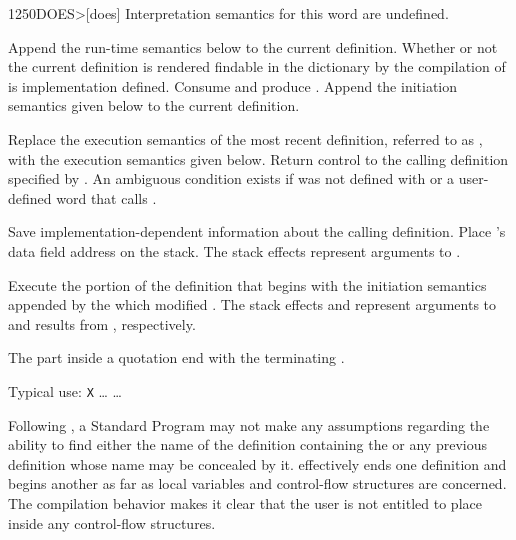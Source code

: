 \enlargethispage{10ex}
\begin{worddef}[DOES]{1250}{DOES>}[does]
\interpret
	Interpretation semantics for this word are undefined.

\compile

	Append the run-time semantics below to the current definition.
	Whether or not the current definition is rendered findable in
	the dictionary by the compilation of  is
	implementation defined. Consume  and
	produce . Append the initiation semantics
	given below to the current definition.

\runtime
	\stack{}{}

	Replace the execution semantics of the most recent definition,
	referred to as , with the  execution
	semantics given below. Return control to the calling definition
	specified by . An ambiguous condition exists
	if  was not defined with  or a
	user-defined word that calls .

\init

	Save implementation-dependent information 
	about the calling definition. Place 's data field
	address on the stack. The stack effects  represent
	arguments to .

\execute[name]

	Execute the portion of the definition that begins with the
	initiation semantics appended by the  which modified
	. The stack effects  and 
	represent arguments to and results from ,
	respectively.

\item[Quotation]
	The  part inside a quotation
	end with the terminating \word[tools]{;]}.
	
	\walso{tools:;]}

	\begin{rationale} %
		Typical use:
			\word{:} \texttt{X} {\ldots}  {\ldots} \word{;}

		Following , a Standard Program may not make any
		assumptions regarding the ability to find either the name of
		the definition containing the  or any previous
		definition whose name may be concealed by it. 
		effectively ends one definition and begins another as far as
		local variables and control-flow structures are concerned.
		The compilation behavior makes it clear that the user is not
		entitled to place  inside any control-flow
		structures.
	\end{rationale}


\end{worddef}
